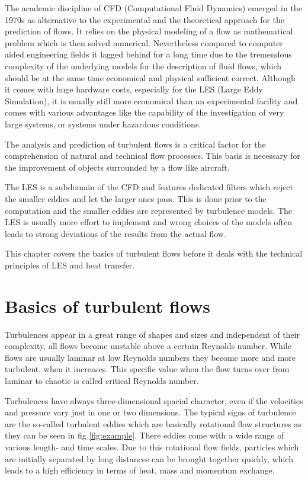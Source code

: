 The academic discipline of CFD (Computational Fluid Dynamics) emerged in the 1970s as alternative to the experimental and the theoretical approach for the prediction of flows. It relies on the physical modeling of a flow as mathematical problem which is then solved numerical. Nevertheless compared to computer aided engineering fields it lagged behind for a long time due to the tremendous complexity of the underlying models for the description of fluid flows, which should be at the same time economical and physical sufficient correct. Although it comes with huge hardware costs, especially for the LES (Large Eddy Simulation), it is usually still more economical than an experimental facility and comes with various advantages like the capability of the investigation of very large systems, or systems under hazardous conditions.

The analysis and prediction of turbulent flows is a critical factor for the comprehension of natural and technical flow processes. This basis is necessary for the improvement of objects surrounded by a flow like aircraft.

The LES is a subdomain of the CFD and features dedicated filters which reject the smaller eddies and let the larger ones pass. This is done prior to the computation and the smaller eddies are represented by turbulence models. The LES is usually more effort to implement and wrong choices of the models often leads to strong deviations of the results from the actual flow.

This chapter covers the basics of turbulent flows before it deals with the technical principles of LES and heat transfer.

\section{Basics of turbulent flows}
Turbulences appear in a great range of shapes and sizes and independent of their complexity, all flows become unstable above a certain Reynolds number. While flows are usually laminar at low Reynolds numbers they become more and more turbulent, when it increases. This specific value when the flow turns over from laminar to chaotic is called critical Reynolds number.

Turbulences have always three-dimensional spacial character, even if the velocities and pressure vary just in one or two dimensions. The typical signs of turbulence are the so-called turbulent eddies which are basically rotational flow structures as they can be seen in fig \ref{fig:example}. There eddies come with a wide range of various length- and time scales. Due to this rotational flow fields, particles which are initially separated by long distances can be brought together quickly, which leads to a high efficiency in terms of heat, mass and momentum exchange.

